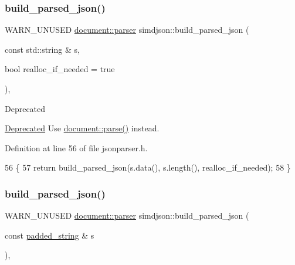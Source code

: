 \subsubsection{\texorpdfstring{build\+\_\+parsed\+\_\+json()}{build\_parsed\_json()}\hspace{0.1cm}{\footnotesize\ttfamily [2/3]}}
{\footnotesize\ttfamily W\+A\+R\+N\+\_\+\+U\+N\+U\+S\+ED \hyperlink{classsimdjson_1_1document_1_1parser}{document\+::parser} simdjson\+::build\+\_\+parsed\+\_\+json (\begin{DoxyParamCaption}\item[{const std\+::string \&}]{s,  }\item[{bool}]{realloc\+\_\+if\+\_\+needed = {\ttfamily true} }\end{DoxyParamCaption})\hspace{0.3cm}{\ttfamily [inline]}, {\ttfamily [noexcept]}}

\begin{DoxyRefDesc}{Deprecated}
\item[\hyperlink{deprecated__deprecated000018}{Deprecated}]Use {\ttfamily \hyperlink{classsimdjson_1_1document_a6f11cda7c4a06fffdc00fdc97d98ae2b}{document\+::parse()}} instead.\end{DoxyRefDesc}


Definition at line 56 of file jsonparser.\+h.


\begin{DoxyCode}
56                                                                                                            
           \{
57   \textcolor{keywordflow}{return} build\_parsed\_json(s.data(), s.length(), realloc\_if\_needed);
58 \}
\end{DoxyCode}
\mbox{\label{namespacesimdjson_addad9710b2a92f3ecd76bf4e9955fb9d}} 
\subsubsection{\texorpdfstring{build\+\_\+parsed\+\_\+json()}{build\_parsed\_json()}\hspace{0.1cm}{\footnotesize\ttfamily [3/3]}}
{\footnotesize\ttfamily W\+A\+R\+N\+\_\+\+U\+N\+U\+S\+ED \hyperlink{classsimdjson_1_1document_1_1parser}{document\+::parser} simdjson\+::build\+\_\+parsed\+\_\+json (\begin{DoxyParamCaption}\item[{const \hyperlink{structsimdjson_1_1padded__string}{padded\+\_\+string} \&}]{s }\end{DoxyParamCaption})\hspace{0.3cm}{\ttfamily [inline]}, {\ttfamily [noexcept]}}

